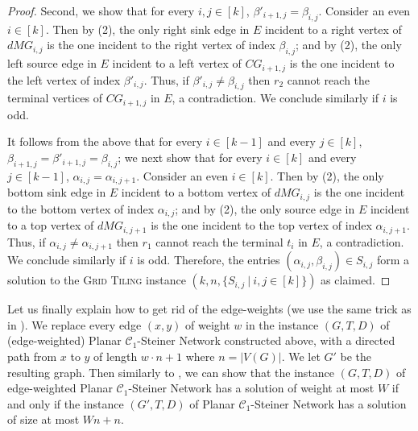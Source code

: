 \begin{proof}
Second, we show that for every $i,j \in [k]$, $\beta'_{i+1,j} = \beta_{i,j}$. Consider an even $i \in [k]$. Then by (2), the only right sink edge in $E$ incident to a right vertex of $dMG_{i,j}$ is the one incident to the right vertex of index $\beta_{i,j}$; and by (2), the only left source edge in $E$ incident to a left vertex of $CG_{i+1,j}$ is the one incident to the left vertex of index $\beta'_{i,j}$. Thus, if $\beta'_{i,j} \neq \beta_{i,j}$ then $r_2$ cannot reach the terminal vertices of $CG_{i+1,j}$ in $E$, a contradiction. We conclude similarly if $i$ is odd. 

It follows from the above that for every $i \in [k-1]$ and every $j \in [k]$, $\beta_{i+1,j} = \beta'_{i+1,j} = \beta_{i,j}$; we next show that for every $i \in [k]$ and every $j \in [k-1]$, $\alpha_{i,j} = \alpha_{i,j+1}$. Consider an even $i \in [k]$. Then by (2), the only bottom sink edge in $E$ incident to a bottom vertex of $dMG_{i,j}$ is the one incident to the bottom vertex of index $\alpha_{i,j}$; and by (2), the only source edge in $E$ incident to a top vertex of $dMG_{i,j+1}$ is the one incident to the top vertex of index $\alpha_{i,j+1}$. Thus, if $\alpha_{i,j} \neq \alpha_{i,j+1}$ then $r_1$ cannot reach the terminal $t_i$ in $E$, a contradiction. We conclude similarly if $i$ is odd. Therefore, the entries $(\alpha_{i,j},\beta_{i,j}) \in S_{i,j}$ form a solution to the \textsc{Grid Tiling} instance $(k,n,\{S_{i,j}~|~i,j \in [k]\})$ as claimed.
\end{proof}

Let us finally explain how to get rid of the edge-weights (we use the same trick as in \cite{ChitnisFHM20}).
We replace every edge $(x,y)$ of weight $w$ in the instance $(G,T,D)$ of (edge-weighted) {\sc Planar $\mathcal{C}_1$-Steiner Network} constructed above,
with a directed path from $x$ to $y$ of length $w\cdot n + 1$ where $n = |V(G)|$. 
We let $G'$ be the resulting graph.
Then similarly to \cite[Theorem A.1]{ChitnisFHM20}, we can show that the instance $(G,T,D)$ of edge-weighted {\sc Planar $\mathcal{C}_1$-Steiner Network} has a solution of weight at most $W$ if and only if the instance $(G',T,D)$ of {\sc Planar $\mathcal{C}_1$-Steiner Network} has a solution of size at most $Wn + n$.
